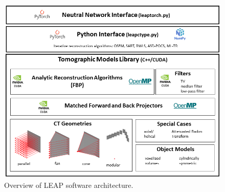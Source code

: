 \documentclass[11pt]{article}
\begin{document}

\begin{figure}[h!]
\begin{center}
\includegraphics[scale=0.65]{LEAPoverview.png}
\end{center}
\vspace{-10pt}\caption{Overview of LEAP software architecture.} \label{fig:LEAParchitecture}
\end{figure}

\end{document}
